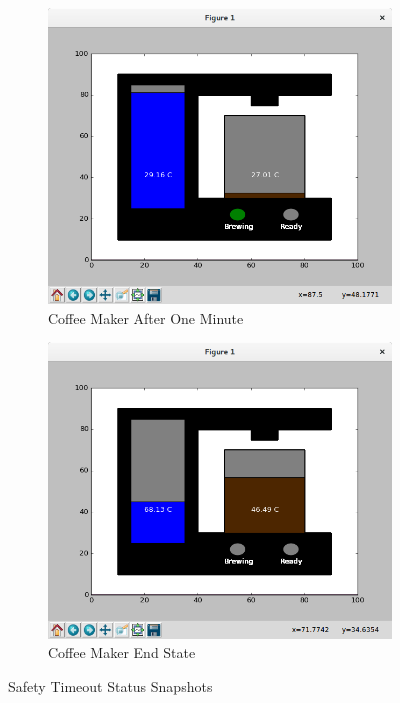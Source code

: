 \documentclass[10pt]{article}
\begin{document}
\begin{center}
  \begin{figure}[H]
    \begin{subfigure}{.5\textwidth}
      \centering
      \includegraphics[width=.8\linewidth]{input/test-2-prog}
      \caption{Coffee Maker After One Minute}
      \label{fig:test-2-prog}
    \end{subfigure}%
    \begin{subfigure}{.5\textwidth}
      \centering
      \includegraphics[width=.8\linewidth]{input/test-2}
      \caption{Coffee Maker End State}
      \label{fig:test-2}
    \end{subfigure}
  \caption{Safety Timeout Status Snapshots}
  \end{figure}
\end{center}
\end{document}
